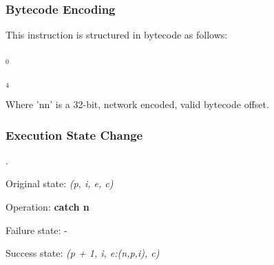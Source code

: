 \subsubsection{Bytecode Encoding}

This instruction is structured in bytecode as follows:

$_0$\ 


$_4$\

Where 'nn' is a 32-bit, network encoded, valid bytecode offset.

\subsubsection{Execution State Change}

.

Original state: \textit{(p, i, e, c)}

Operation: \textbf{catch n}

Failure state: -

Success state: \textit{(p + 1, i, e:(n,p,i), c)}

